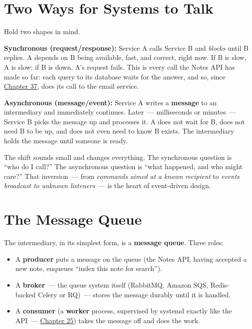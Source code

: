 \setcounter{section}{0}
\section{Two Ways for Systems to Talk}\label{41-event-driven-architecture:411-two-ways-for-systems-to-talk}

Hold two shapes in mind.

\textbf{Synchronous (request/response):} Service A calls Service B and \emph{blocks} until B replies. A depends on B being available, fast, and correct, right now. If B is slow, A is slow; if B is down, A's request fails. This is every call the Notes API has made so far: each query to its database waits for the answer, and so, since \hyperref[ch:37-reliability]{Chapter 37}, does its call to the email service.

\textbf{Asynchronous (message/event):} Service A writes a \textbf{message} to an intermediary and immediately continues. Later~--- milliseconds or minutes~--- Service B picks the message up and processes it. A does not wait for B, does not need B to be up, and does not even need to know B exists. The intermediary holds the message until someone is ready.

The shift sounds small and changes everything. The synchronous question is ``who do I call?'' The asynchronous question is ``what happened, and who might care?'' That inversion~--- from \emph{commands aimed at a known recipient} to \emph{events broadcast to unknown listeners}~--- is the heart of event-driven design.

\setcounter{section}{1}
\section{The Message Queue}\label{41-event-driven-architecture:412-the-message-queue}

The intermediary, in its simplest form, is a \textbf{message queue}. Three roles:

\begin{itemize}
\tightlist
\item
  A \textbf{producer} puts a message on the queue (the Notes API, having accepted a new note, enqueues ``index this note for search'').
\item
  A \textbf{broker}~--- the queue system itself (RabbitMQ, Amazon SQS, Redis-backed Celery or RQ)~--- stores the message durably until it is handled.
\item
  A \textbf{consumer} (a \textbf{worker} process, supervised by systemd exactly like the API~--- \hyperref[ch:25-process-management]{Chapter 25}) takes the message off and does the work.
\end{itemize}

